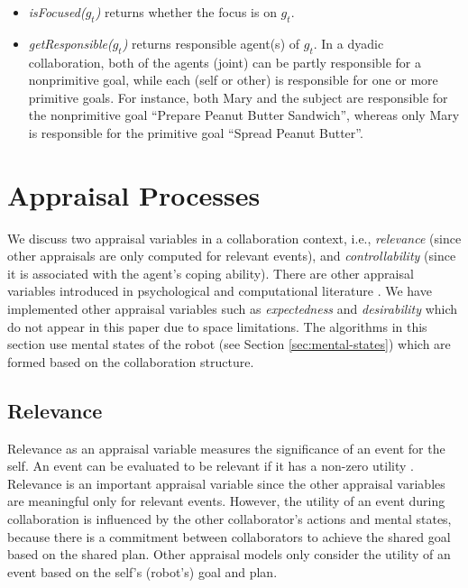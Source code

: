 \documentclass{article}
\begin{document}
\begin{itemize}[leftmargin=2pt]
  \item \textit{isFocused($g_t$)} returns whether the focus is on $g_t$.
  
  \item \textit{getResponsible($g_t$)} returns responsible agent(s) of $g_t$. In
  a dyadic collaboration, both of the agents (joint) can be partly responsible
  for a nonprimitive goal, while each (self or other) is responsible for one or
  more primitive goals. For instance, both Mary and the subject are responsible
  for the nonprimitive goal ``Prepare Peanut Butter Sandwich'', whereas only
  Mary is responsible for the primitive goal ``Spread Peanut Butter''.
\end{itemize}

\vspace*{-3mm}
\section{Appraisal Processes}
\label{sec:appraisal-process}

We discuss two appraisal variables in a collaboration context, i.e.,
\textit{relevance} (since other appraisals are only computed for relevant
events), and \textit{controllability} (since it is associated with the agent's
coping ability). There are other appraisal variables introduced in psychological
\cite{scherer:appraisal-processes} and computational literature
\cite{gratch:domain-independent}. We have implemented other appraisal variables
such as \textit{expectedness} \cite{shayganfar:appraisal-short} and
\textit{desirability} \cite{shayganfar:emotional-awareness} which do not appear
in this paper due to space limitations. The algorithms in this section use
mental states of the robot (see Section \ref{sec:mental-states}) which are
formed based on the collaboration structure.

\subsection{Relevance}

Relevance as an appraisal variable measures the significance of an event for the
self. An event can be evaluated to be relevant if it has a non-zero utility
\cite{marsella:ema-process-model}. Relevance is an important appraisal variable
since the other appraisal variables are meaningful only for relevant events.
However, the utility of an event during collaboration is influenced by the other
collaborator's actions and mental states, because there is a commitment between
collaborators to achieve the shared goal based on the shared plan. Other
appraisal models only consider the utility of an event based on the self's
(robot's) goal and plan.
\end{document}
